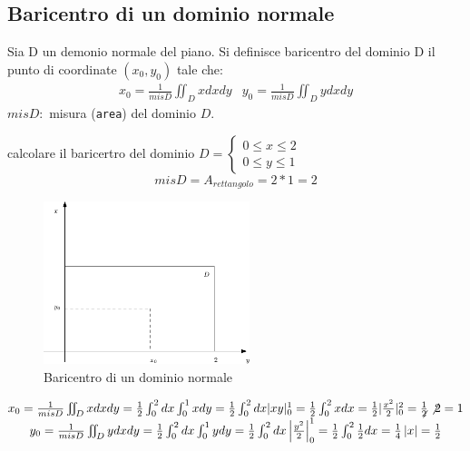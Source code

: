 \subsection{Baricentro di un dominio normale}
\begin{defi}
  Sia D un demonio normale del piano. Si definisce {\color{red}baricentro del dominio} D il punto di
  coordinate $(x_0,y_0)$ tale che:
  \begin{equation*}
    \begin{matrix}
      x_0=\frac{1}{mis D} \iint_D xdxdy & y_0=\frac{1}{mis D} \iint_D ydxdy
    \end{matrix}
  \end{equation*}
  $mis D:$ misura ({\tt area}) del dominio $D$.
\end{defi}
\begin{esempio}
  calcolare il baricertro del dominio $D=\begin{cases}
                                           0\leq x\leq 2\\
                                           0\leq y\leq 1
                                         \end{cases}$
  \begin{equation*}
    mis D=A_{rettangolo}=2*1=2
  \end{equation*}
  \begin{figure}[ht]
    \centering
    \includegraphics[width=6cm]{img/finiti/baricentrodiundominionormale.eps}
    \caption{Baricentro di un dominio normale}
  \end{figure}
  \begin{equation*}
    \begin{matrix}
      x_0=\frac{1}{mis D}\iint_D xdxdy=\frac{1}{2}\int_0^2dx\int_0^1xdy=\frac{1}{2}\int^2_0dx\lvert xy\rvert_0^1= \frac{1}{2}\int_0^2xdx=\frac{1}{2}\lvert\frac{x^2}{2}\rvert_0^2=\frac{1}{\not{2}}\not{2}=1\\
      y_0=\frac{1}{mis D}\iint_D ydxdy=\frac{1}{2}\int_0^2dx\int_0^1ydy=\frac{1}{2}\int_0^2dx\left|\frac{y^2}{2}\right|^1_0=\frac{1}{2}\int^2_0\frac{1}{2}dx=\frac{1}{4}\left|x\right|=\frac{1}{2}

\end{matrix}
\end{equation*}
\end{esempio}
